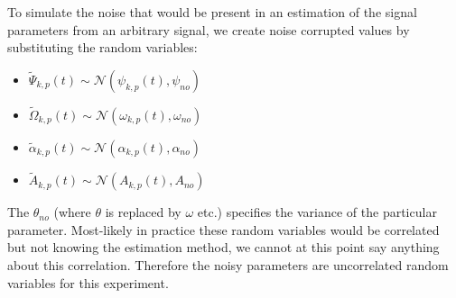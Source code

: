 To simulate the noise that would be present in an estimation of the signal
parameters from an arbitrary signal, we create noise corrupted values by
substituting the random variables:
\begin{itemize}
    \item
        $\tilde{\Psi}_{k,p}(t) \sim
        \mathcal{N}(\psi_{k,p}(t),\psi_{no})$
    \item
        $\tilde{\Omega}_{k,p}(t) \sim
        \mathcal{N}(\omega_{k,p}(t),\omega_{no})$
    \item
        $\tilde{\alpha}_{k,p}(t) \sim
        \mathcal{N}(\alpha_{k,p}(t),\alpha_{no})$
    \item
        $\tilde{A}_{k,p}(t) \sim
        \mathcal{N}(A_{k,p}(t),A_{no})$
\end{itemize}
The $\theta_{no}$ (where $\theta$ is replaced by $\omega$ etc.) specifies the
variance of the particular parameter. Most-likely in practice these random
variables would be correlated but not knowing the estimation method, we cannot
at this point say anything about this correlation. Therefore the noisy
parameters are uncorrelated random variables for this experiment.

